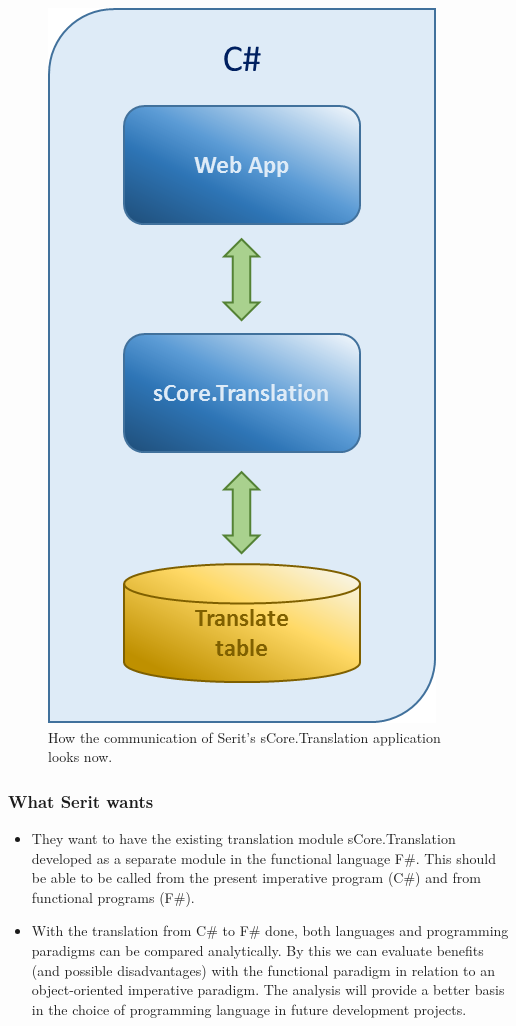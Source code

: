 \documentclass[12pt, a4paper]{article}
\begin{document}
\begin{figure}[!h]
    \includegraphics[scale=0.4]{image00}
    \centering
    \caption{How the communication of Serit's sCore.Translation application looks now.}
\end{figure}

\newpage
\subsubsection{What Serit wants}

\begin{itemize}
	\item They want to have the existing translation module sCore.Translation developed as a separate module in the functional language F\#. This should be able to be called from the present imperative program (C\#) and from functional programs (F\#).
	\item With the translation from C\# to F\# done, both languages and programming paradigms can be compared analytically. By this we can evaluate benefits (and possible disadvantages) with the functional paradigm in relation to an object-oriented imperative paradigm. The analysis will provide a better basis in the choice of programming language in future development projects.
\end{itemize}
\end{document}
